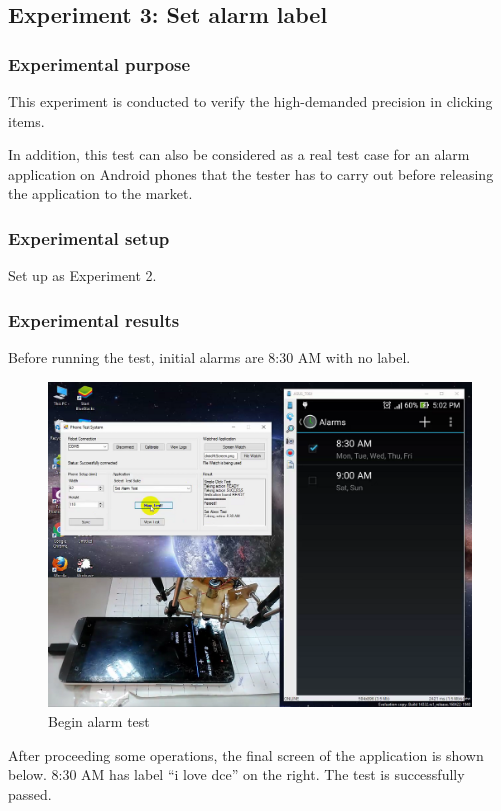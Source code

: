 \subsection{Experiment 3: Set alarm label}
\subsubsection{Experimental purpose}
This experiment is conducted to verify the high-demanded precision in clicking items.

In addition, this test can also be considered as a real test case for an alarm application on Android phones that the tester has to carry out before releasing the application to the market.

\subsubsection{Experimental setup}
Set up as Experiment 2.

\subsubsection{Experimental results}
Before running the test, initial alarms are 8:30 AM with no label.

	\begin{figure}[H]
		\centering
		\includegraphics[scale=0.5]{Chapters/Fig/alarm_start.png}
		\caption{Begin alarm test}
		\label{fig:alarm_start}
	\end{figure}

After proceeding some operations, the final screen of the application is shown below. 8:30 AM has label ``i love dce'' on the right. The test is successfully passed.

